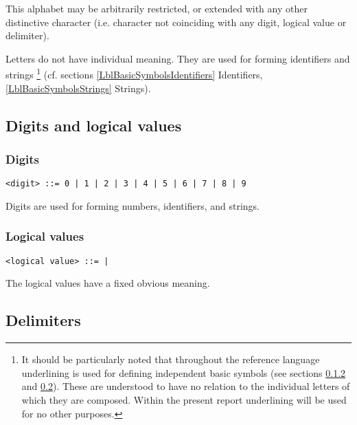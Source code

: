 \documentclass[a4paper,11pt]{article}
\begin{document}
This alphabet may be arbitrarily restricted, or extended with any other
distinctive character (i.e. character not coinciding with any digit,
logical value or delimiter).

Letters do not have individual meaning. They are used for forming
identifiers and strings \footnote{It should be particularly noted that
throughout the reference language underlining is used for defining
independent basic symbols (see sections \ref{LblBasicSymbolsLogical}
and \ref{LblBasicSymbolsDelimiters}). These are understood to have no
relation to the individual letters of which they are composed. Within
the present report underlining will be used for no other purposes.}
(cf. sections \ref{LblBasicSymbolsIdentifiers} Identifiers,
\ref{LblBasicSymbolsStrings} Strings).

\subsection{Digits and logical values}

\subsubsection{Digits}
\label{LblBasicSymbolsDigits}

\begin{flushleft}
\vspace{0.2em}\texttt{<digit> ::= 0 | 1 | 2 | 3 | 4 | 5 | 6 | 7 | 8 | 9}\\
\end{flushleft}

Digits are used for forming numbers, identifiers, and strings.


\subsubsection{Logical values}
\label{LblBasicSymbolsLogical}

\begin{flushleft}
\vspace{0.2em}\texttt{<logical value> ::=  | }\\
\end{flushleft}

The logical values have a fixed obvious meaning.



\subsection{Delimiters}
\label{LblBasicSymbolsDelimiters}
\end{document}
